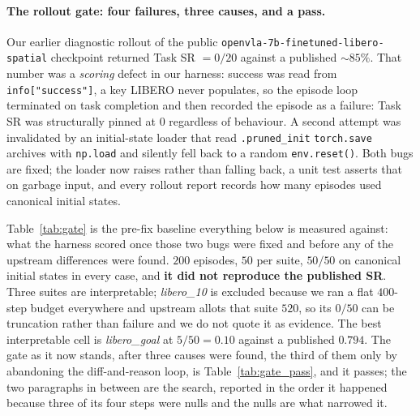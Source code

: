 \documentclass{article}
\begin{document}
\paragraph{The rollout gate: four failures, three causes, and a pass.} Our earlier diagnostic rollout of the public \texttt{openvla-7b-finetuned-libero-spatial} checkpoint returned Task SR $=0/20$ against a published ${\sim}85\%$. That number was a \emph{scoring} defect in our harness: success was read from \texttt{info["success"]}, a key LIBERO never populates, so the episode loop terminated on task completion and then recorded the episode as a failure: Task SR was structurally pinned at $0$ regardless of behaviour. A second attempt was invalidated by an initial-state loader that read \texttt{.pruned\_init} \texttt{torch.save} archives with \texttt{np.load} and silently fell back to a random \texttt{env.reset()}. Both bugs are fixed; the loader now raises rather than falling back, a unit test asserts that on garbage input, and every rollout report records how many episodes used canonical initial states.

Table~\ref{tab:gate} is the pre-fix baseline everything below is measured against: what the harness scored once those two bugs were fixed and before any of the upstream differences were found. $200$ episodes, $50$ per suite, $50/50$ on canonical initial states in every case, and \textbf{it did not reproduce the published SR}. Three suites are interpretable; \emph{libero\_10} is excluded because we ran a flat $400$-step budget everywhere and upstream allots that suite $520$, so its $0/50$ can be truncation rather than failure and we do not quote it as evidence. The best interpretable cell is \emph{libero\_goal} at $5/50 = 0.10$ against a published $0.794$. The gate as it now stands, after three causes were found, the third of them only by abandoning the diff-and-reason loop, is Table~\ref{tab:gate_pass}, and it passes; the two paragraphs in between are the search, reported in the order it happened because three of its four steps were nulls and the nulls are what narrowed it.
\end{document}
